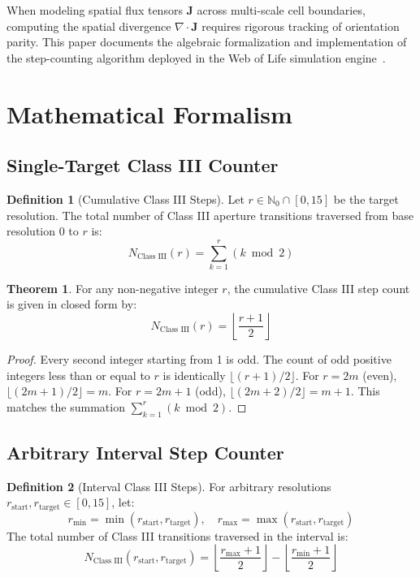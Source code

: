 \documentclass[11pt,a4paper]{article}
\theoremstyle{definition}
\newtheorem{definition}{Definition}
\newtheorem{theorem}{Theorem}
\begin{document}
When modeling spatial flux tensors $\mathbf{J}$ across multi-scale cell boundaries, computing the spatial divergence $\nabla \cdot \mathbf{J}$ requires rigorous tracking of orientation parity. This paper documents the algebraic formalization and implementation of the step-counting algorithm deployed in the Web of Life simulation engine~\cite{weboflife2025}.

\section{Mathematical Formalism}

\subsection{Single-Target Class III Counter}
\begin{definition}[Cumulative Class III Steps]
Let $r \in \mathbb{N}_0 \cap [0, 15]$ be the target resolution. The total number of Class III aperture transitions traversed from base resolution $0$ to $r$ is:
\begin{equation}
N_{\text{Class III}}(r) = \sum_{k=1}^r (k \bmod 2)
\end{equation}
\end{definition}

\begin{theorem}
For any non-negative integer $r$, the cumulative Class III step count is given in closed form by:
\begin{equation}
N_{\text{Class III}}(r) = \left\lfloor \frac{r + 1}{2} \right\rfloor
\end{equation}
\end{theorem}
\begin{proof}
Every second integer starting from 1 is odd. The count of odd positive integers less than or equal to $r$ is identically $\lfloor (r+1)/2 \rfloor$. For $r=2m$ (even), $\lfloor (2m+1)/2 \rfloor = m$. For $r=2m+1$ (odd), $\lfloor (2m+2)/2 \rfloor = m+1$. This matches the summation $\sum_{k=1}^r (k \bmod 2)$.
\end{proof}

\subsection{Arbitrary Interval Step Counter}
\begin{definition}[Interval Class III Steps]
For arbitrary resolutions $r_{\text{start}}, r_{\text{target}} \in [0, 15]$, let:
\begin{equation}
r_{\min} = \min(r_{\text{start}}, r_{\text{target}}), \quad r_{\max} = \max(r_{\text{start}}, r_{\text{target}})
\end{equation}
The total number of Class III transitions traversed in the interval is:
\begin{equation}
N_{\text{Class III}}(r_{\text{start}}, r_{\text{target}}) = \left\lfloor \frac{r_{\max} + 1}{2} \right\rfloor - \left\lfloor \frac{r_{\min} + 1}{2} \right\rfloor
\end{equation}
\end{definition}
\end{document}

